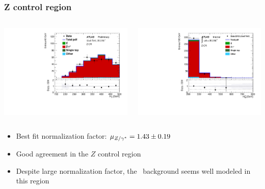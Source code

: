 \documentclass[10pt, svgnames]{beamer}
\begin{document}
\begin{frame}
  \frametitle{Z control region}
  \begin{columns}
    \begin{block}{\HT}
      \includegraphics[width=\textwidth]{figures/blstop/cr_Z_ht_signal.pdf}
    \end{block}
    \begin{block}{\MBL}
      \includegraphics[width=\textwidth]{figures/cr_Z_mbl_0.pdf}
    \end{block}
  \end{columns}
  \begin{itemize}
    \item Best fit normalization factor: $\mu_{Z/\gamma^{*}} = 1.43 \pm 0.19$
    \item Good agreement in the $Z$ control region
    \item Despite large normalization factor, the \ZGAMMA\ background seems
      well modeled in this region
  \end{itemize}
\end{frame}
\end{document}
